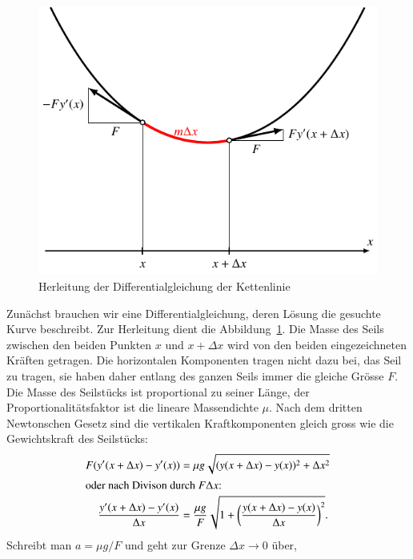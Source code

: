 \begin{loesung}
\def\asinh{\operatorname{arsinh}}
\begin{figure}
\centering
\includegraphics{chapters/50-ode/figures/kettenlinie.pdf}
\caption{Herleitung der Differentialgleichung der Kettenlinie
\label{numerik:kettenlinie}}
\end{figure}
Zunächst brauchen wir eine Differentialgleichung, deren Lösung die
gesuchte Kurve beschreibt.
Zur Herleitung dient die Abbildung~\ref{numerik:kettenlinie}.
Die Masse des Seils zwischen den beiden Punkten $x$ und $x+\Delta x$
wird von den beiden eingezeichneten Kräften getragen.
%
Die horizontalen Komponenten tragen nicht dazu bei, das Seil zu
tragen, sie haben daher entlang des ganzen Seils immer die gleiche
Grösse $F$.
%
Die Masse des Seilstücks ist proportional zu seiner Länge,
der Proportionalitätsfaktor ist die lineare Massendichte $\mu$.
%
Nach dem dritten Newtonschen Gesetz
%
sind die vertikalen Kraftkomponenten gleich gross wie die Gewichtskraft
des Seilstücks:
%
\begin{align*}
F(y'(x+\Delta x)-y'(x))
&= \mu g\sqrt{(y(x+\Delta x)-y(x))^2+\Delta x^2}
\\
\intertext{oder nach Divison durch $F\Delta x$:}
\frac{y'(x+\Delta x)-y'(x)}{\Delta x}
&=\frac{\mu g}{F}\sqrt{1+\biggl(\frac{y(x+\Delta x)-y(x)}{\Delta x}\biggr)^2}.
\end{align*}
Schreibt man $a=\mu g/F$ und geht zur Grenze $\Delta x\to 0$ über,

\end{loesung}
